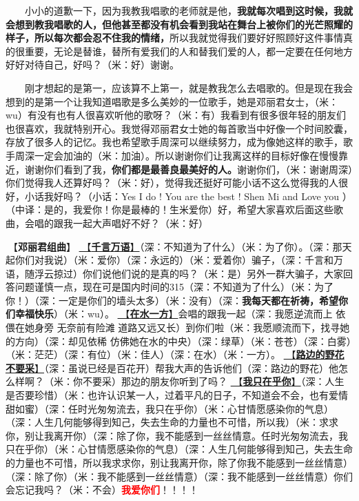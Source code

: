 \documentclass[]{ctexbook}
\begin{document}
  小小的道歉一下，因为我教我唱歌的老师就是他，\textbf{我就每次唱到这时候，我就会想到教我唱歌的人，但他甚至都没有机会看到我站在舞台上被你们的光芒照耀的样子，所以每次都会忍不住我的情绪，}所以我就觉得我们要好好照顾好这件事情真的很重要，无论是替谁，替所有爱我们的人和替我们爱的人，都一定要在任何地方好好对待自己，好吗？（米：好）谢谢。

  刚才想起的是第一，应该算不上第一，就是教我怎么去唱歌的。但是现在我会想到的是第一个让我知道唱歌是多么美妙的一位歌手，她是邓丽君女士，（米：wu）有没有也有人很喜欢听他的歌呀？（米：有）我看到有很多很年轻的朋友们也很喜欢，我就特别开心。我觉得邓丽君女士她的每首歌当中好像一个时间胶囊，存放了很多人的记忆。我也希望歌手周深可以继续努力，成为像她这样的歌手，歌手周深一定会加油的（米：加油）。所以谢谢你们让我离这样的目标好像在慢慢靠近，谢谢你们看到了我，\textbf{你们都是最善良最美好的人。}谢谢你们，（米：谢谢周深）你们觉得我人还算好吗？（米：好），觉得我还挺好可能小话不这么觉得我的人很好，小话我好吗？（小话：Yes I do ! You are the best ! Shen Mi and Love you ）（中译：是的，我爱你！你是最棒的！生米爱你）好，希望大家喜欢后面这些歌曲，会唱的跟我一起大声唱好不好？（米：好）

🎵【\textbf{邓丽君组曲}】
\hyperref[thousands-of-words]{🎵【\textbf{千言万语}】}（深：不知道为了什么）（米：为了你）。（深：那天起你们对我说）（米：爱你）（深：永远的）（米：爱着你）骗子，（深：千言和万语，随浮云掠过）你们说他们说的是真的吗？（米：是）另外一群大骗子，大家回答问题谨慎一点，现在可是国内时间的315（深：不知道为了什么）（米：为了你！）（深：一定是你们的墙头太多）（米：没有）（深：\textbf{我每天都在祈祷，希望你们幸福快乐}）（米：wu）。
\hyperref[on-the-water-side]{🎵【\textbf{在水一方}】}会唱的跟我一起（深：我愿逆流而上 依偎在她身旁 无奈前有险滩 道路又远又长）到你们啦（米：我愿顺流而下，找寻她的方向）（深：却见依稀 仿佛她在水的中央）（深：绿草）（米：苍苍）（深：白雾）（米：茫茫）（深：有位）（米：佳人）（深：在水）（米：一方）。
\hyperref[only-with-me]{🎵【\textbf{路边的野花不要采}】}（深：虽说已经是百花开）帮我大声的告诉他们（深：路边的野花）他怎么样啊？（米：你不要采）那边的朋友你听到了吗？
\hyperref[only-you]{🎵【\textbf{我只在乎你}】}（深：人生是否要珍惜）（米：也许认识某一人，过着平凡的日子，不知道会不会，也有爱情甜如蜜）（深：任时光匆匆流去，我只在乎你）（米：心甘情愿感染你的气息）（深：人生几何能够得到知己，失去生命的力量也不可惜，所以我）（米：求求你，别让我离开你）（深：除了你，我不能感到一丝丝情意。任时光匆匆流去，我只在乎你）（米：心甘情愿感染你的气息）（深：人生几何能够得到知己，失去生命的力量也不可惜，所以我求求你，别让我离开你，除了你我不能感到一丝丝情意）（深：除了你）（米：我不能感到一丝丝情意）（深：我不能感到一丝丝情意）你们会忘记我吗？（米：不会）\textbf{\textcolor{red}{我爱你们}}！！！！
\end{document}
